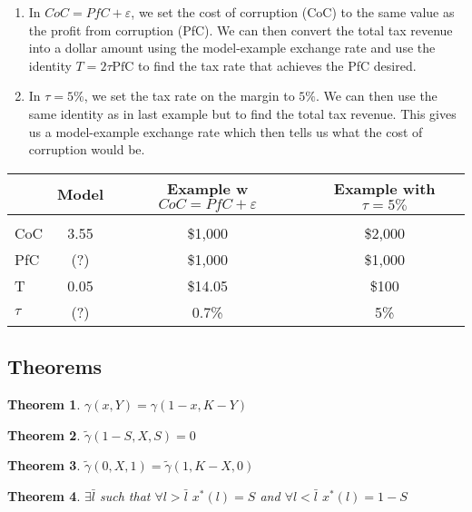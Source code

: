 \documentclass[12pt]{article}
\newtheorem{thm}{Theorem}
\begin{document}
    \begin{enumerate}
      \item In $CoC = PfC + \varepsilon$, we set the cost of corruption (CoC) to the same value
      as the profit from corruption (PfC). We can then convert the total tax revenue into a dollar
      amount using the model-example exchange rate and use the identity $T = 2 \tau \text{PfC}$ to
      find the tax rate that achieves the PfC desired.
      \item In $\tau = 5\%$, we set the tax rate on the margin to $5\%$. We can then use the
      same identity as in last example but to find the total tax revenue. This gives us a
      model-example exchange rate which then tells us what the cost of corruption would be.
    \end{enumerate}

    \begin{center}
    \begin{tabular}{l|ccc}
      & Model & Example w $CoC = PfC + \varepsilon$ & Example with $\tau = 5\%$ \\
      \hline \\
      CoC & 3.55 & \$1,000 &  \$2,000 \\
      PfC & (?) & \$1,000 & \$1,000 \\
      T & 0.05 & \$14.05 & \$100 \\
      $\tau$ & (?) & 0.7\% & 5\% \\
    \end{tabular}
    \end{center}

  \subsection{Theorems}

    \begin{thm}
      $\gamma(x, Y) = \gamma(1 - x, K - Y)$
    \end{thm}

    \begin{thm}
      $\tilde{\gamma}(1 - S, X, S) = 0$
    \end{thm}

    \begin{thm}
      $\tilde{\gamma}(0, X, 1) = \tilde{\gamma}(1, K-X, 0)$
    \end{thm}

    \begin{thm}
      $\exists \bar{l}$ such that $\forall l > \bar{l}$ $x^*(l) = S$ and $\forall l < \bar{l}$ $x^*(l) = 1-S$
    \end{thm}
\end{document}
